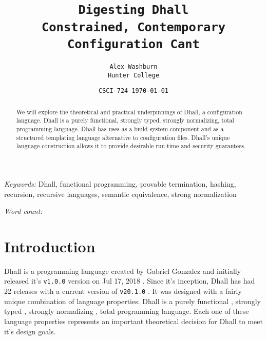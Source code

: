 \documentclass[12pt]{diazessay}
\title{\texttt{\huge{Digesting Dhall} \\\vspace*{3mm} {\large Constrained, Contemporary Configuration Cant}}} %
\author{\texttt{{\Large Alex Washburn} \\ Hunter College}} %
\date{\texttt{CSCI-724 \today}} %
\begin{document}
\maketitle %



\begin{abstract}
We will explore the theoretical and practical underpinnings of Dhall, a configuration language.
Dhall is a purely functional, strongly typed, strongly normalizing, total programming language.
Dhall has uses as a build system component and as a structured templating language alternative to configuration files.
Dhall's unique language construction allows it to provide desirable run-time and security guarantees.
\end{abstract}

\hspace*{3.6mm}\textit{Keywords:} {\footnotesize Dhall, functional programming, provable termination, hashing, recursion, recursive languages, semantic equivalence, strong normalization}
\vspace*{1mm}

\hspace*{3.6mm}\textit{Word count:} {\footnotesize \bashStdout}

\pagebreak


\section*{Introduction}

Dhall is a programming language created by Gabriel Gonzalez and initially released it's \texttt{v1.0.0} version on Jul 17, 2018 \cite{Dhall2018}.
Since it's inception, Dhall has had 22 releases with a current version of \texttt{v20.1.0} \cite{Dhall2018}.
It was designed with a fairly unique combination of language properties.
Dhall is a purely functional \cite{sabry_1998}, strongly typed \cite{cardelli1989typeful}, strongly normalizing \cite{baader1999term}, total \cite{turner1995elementary} programming language.
Each one of these language properties represents an important theoretical decision for Dhall to meet it's design goals.
\end{document}
